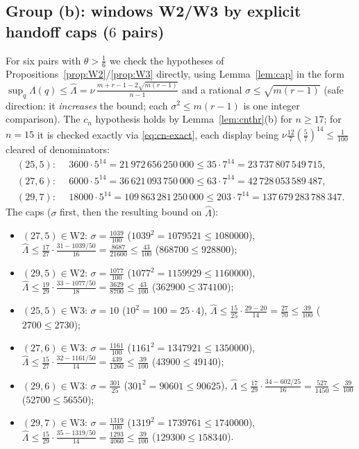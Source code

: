 \documentclass[11pt]{amsart}
\theoremstyle{remark}
\newcommand{\Lhat}{\widehat\Lambda}
\begin{document}
\subsection{Group (b): windows W2/W3 by explicit handoff caps ($6$ pairs)}\label{sec:grpB}
For six pairs with $\theta>\tfrac16$ we check the hypotheses of Propositions~\ref{prop:W2}/\ref{prop:W3} directly, using Lemma~\ref{lem:cap} in the form $\sup_q\Lambda(q)\le\Lhat=\nu\,\frac{m+r-1-2\sqrt{m(r-1)}}{n-1}$ and a rational $\sigma\le\sqrt{m(r-1)}$ (safe direction: it \emph{increases} the bound; each $\sigma^2\le m(r-1)$ is one integer comparison).  The $c_n$ hypothesis holds by Lemma~\ref{lem:cnthr}(b) for $n\ge17$; for $n=15$ it is checked exactly via \eqref{eq:cn-exact}, each display being $\nu\frac{12}7(\tfrac57)^{14}\le\tfrac1{100}$ cleared of denominators:
\begin{equation}\label{eq:c15}
\begin{aligned}
        (25,5):&\ \ 3600\cdot5^{14}=21\,972\,656\,250\,000
                \le35\cdot7^{14}=23\,737\,807\,549\,715,\\
        (27,6):&\ \ 6000\cdot5^{14}=36\,621\,093\,750\,000
                \le63\cdot7^{14}=42\,728\,053\,589\,487,\\
        (29,7):&\ \ 18000\cdot5^{14}=109\,863\,281\,250\,000
                \le203\cdot7^{14}=137\,679\,283\,788\,347.
\end{aligned}
\end{equation}
The caps ($\sigma$ first, then the resulting bound on $\Lhat$):
\begin{itemize}[leftmargin=2em]
\item $(27,5)\in\mathrm{W2}$: $\sigma=\tfrac{1039}{100}$ ($1039^2=1079521\le1080000$),\quad
 $\Lhat\le\tfrac{17}{27}\cdot\tfrac{31-1039/50}{16}=\tfrac{8687}{21600}\le\tfrac{43}{100}$ ($868700\le928800$);
\item $(29,5)\in\mathrm{W2}$: $\sigma=\tfrac{1077}{100}$ ($1077^2=1159929\le1160000$),\quad
 $\Lhat\le\tfrac{19}{29}\cdot\tfrac{33-1077/50}{18}=\tfrac{3629}{8700}\le\tfrac{43}{100}$ ($362900\le374100$);
\item $(25,5)\in\mathrm{W3}$: $\sigma=10$ ($10^2=100=25\cdot4$),\quad
 $\Lhat\le\tfrac{15}{25}\cdot\tfrac{29-20}{14}=\tfrac{27}{70}\le\tfrac{39}{100}$ ($2700\le2730$);
\item $(27,6)\in\mathrm{W3}$: $\sigma=\tfrac{1161}{100}$ ($1161^2=1347921\le1350000$),\quad
 $\Lhat\le\tfrac{15}{27}\cdot\tfrac{32-1161/50}{14}=\tfrac{439}{1260}\le\tfrac{39}{100}$ ($43900\le49140$);
\item $(29,6)\in\mathrm{W3}$: $\sigma=\tfrac{301}{25}$ ($301^2=90601\le90625$),\quad
 $\Lhat\le\tfrac{17}{29}\cdot\tfrac{34-602/25}{16}=\tfrac{527}{1450}\le\tfrac{39}{100}$ ($52700\le56550$);
\item $(29,7)\in\mathrm{W3}$: $\sigma=\tfrac{1319}{100}$ ($1319^2=1739761\le1740000$),\quad
 $\Lhat\le\tfrac{15}{29}\cdot\tfrac{35-1319/50}{14}=\tfrac{1293}{4060}\le\tfrac{39}{100}$ ($129300\le158340$).
\end{itemize}
\end{document}
